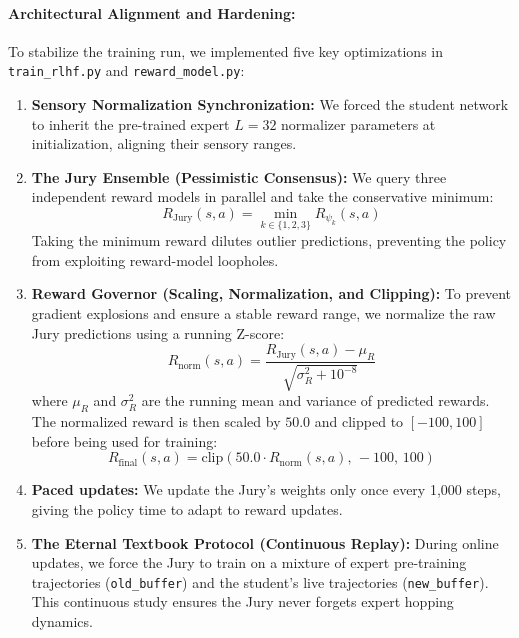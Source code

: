 \documentclass[11pt,a4paper]{article}
\begin{document}
\paragraph{Architectural Alignment and Hardening:}
To stabilize the training run, we implemented five key optimizations in \texttt{train\_rlhf.py} and \texttt{reward\_model.py}:
\begin{enumerate}
    \item \textbf{Sensory Normalization Synchronization:} We forced the student network to inherit the pre-trained expert $L=32$ normalizer parameters at initialization, aligning their sensory ranges.
    \item \textbf{The Jury Ensemble (Pessimistic Consensus):} We query three independent reward models in parallel and take the conservative minimum:
    \begin{equation}
    R_{\text{Jury}}(s, a) = \min_{k \in \{1, 2, 3\}} R_{\psi_k}(s, a)
    \end{equation}
    Taking the minimum reward dilutes outlier predictions, preventing the policy from exploiting reward-model loopholes.
    \item \textbf{Reward Governor (Scaling, Normalization, and Clipping):} To prevent gradient explosions and ensure a stable reward range, we normalize the raw Jury predictions using a running Z-score:
    \begin{equation}
    R_{\text{norm}}(s, a) = \frac{R_{\text{Jury}}(s, a) - \mu_R}{\sqrt{\sigma^2_R + 10^{-8}}}
    \end{equation}
    where $\mu_R$ and $\sigma^2_R$ are the running mean and variance of predicted rewards. The normalized reward is then scaled by $50.0$ and clipped to $[-100, 100]$ before being used for training:
    \begin{equation}
    R_{\text{final}}(s, a) = \text{clip}\left(50.0 \cdot R_{\text{norm}}(s, a), \, -100, \, 100\right)
    \end{equation}
    \item \textbf{Paced updates:} We update the Jury's weights only once every 1,000 steps, giving the policy time to adapt to reward updates.
    \item \textbf{The Eternal Textbook Protocol (Continuous Replay):} During online updates, we force the Jury to train on a mixture of expert pre-training trajectories (\texttt{old\_buffer}) and the student's live trajectories (\texttt{new\_buffer}). This continuous study ensures the Jury never forgets expert hopping dynamics.
\end{enumerate}
\end{document}
